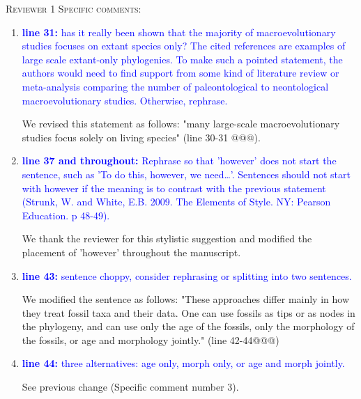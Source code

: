 \documentclass[12pt,letterpaper]{article}
\renewcommand{\section}[1]{%
\bigskip
\begin{center}
\begin{Large}
\normalfont\scshape #1
\medskip
\end{Large}
\end{center}}
\begin{document}
\section{Reviewer 1 Specific comments:}
\begin{enumerate}

\item{\textcolor{blue}{\textbf{line 31:} has it really been shown that the majority of macroevolutionary studies focuses on extant species only? The cited references are examples of large scale extant-only phylogenies. To make such a pointed statement, the authors would need to find support from some kind of literature review or meta-analysis comparing the number of paleontological to neontological macroevolutionary studies. Otherwise, rephrase. }}

We revised this statement as follows: "many large-scale macroevolutionary studies focus solely on living species" (line 30-31 @@@).

\item{\textcolor{blue}{\textbf{line 37 and throughout:} Rephrase so that 'however' does not start the sentence, such as 'To do this, however, we need…'. Sentences should not start with however if the meaning is to contrast with the previous statement (Strunk, W. and White, E.B. 2009. The Elements of Style. NY: Pearson Education. p 48-49).}}

We thank the reviewer for this stylistic suggestion and modified the placement of 'however' throughout the manuscript.

\item{\textcolor{blue}{\textbf{line 43:} sentence choppy, consider rephrasing or splitting into two sentences.}}

We modified the sentence as follows: "These approaches differ mainly in how they treat fossil taxa and their data. One can use fossils as tips or as nodes in the phylogeny, and can use only the age of the fossils, only the morphology of the fossils, or age and morphology jointly." (line 42-44@@@)

\item{\textcolor{blue}{\textbf{line 44:} three alternatives: age only, morph only, or age and morph jointly. }}

See previous change (Specific comment number 3).


\end{enumerate}
\end{document}
